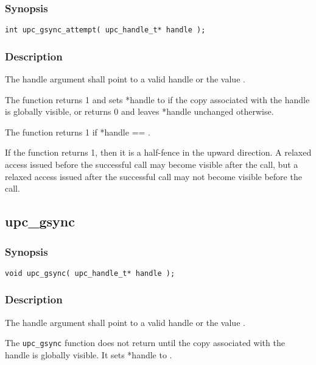 \subsubsection{Synopsis}

\begin{verbatim}
int upc_gsync_attempt( upc_handle_t* handle ); 
\end{verbatim}

\subsubsection{Description}

\npf The handle argument shall point to a valid handle or the value
\complete{}.

\np The \function{} function returns 1 and sets *handle to \complete{}
if the copy associated with the handle is globally visible, or returns 0 and
leaves *handle unchanged otherwise.

\np The \function{} function returns 1 if *handle == \complete{}.

\np If the \function{} function returns 1, then it is a half-fence in the
upward direction.  A relaxed access issued before the successful \function{} call
may become visible after the call, but a relaxed access issued after the
successful \function{} call may not become visible before the call.

\subsection{upc\_gsync}
\def\function{{\tt upc\_gsync}}

\subsubsection{Synopsis}

\begin{verbatim}
void upc_gsync( upc_handle_t* handle );
\end{verbatim}

\subsubsection{Description}

\npf The handle argument shall point to a valid handle or the value
\complete{}.

\np The \function{} function does not return until the copy associated
with the handle is globally visible.  It sets *handle to \complete{}.

